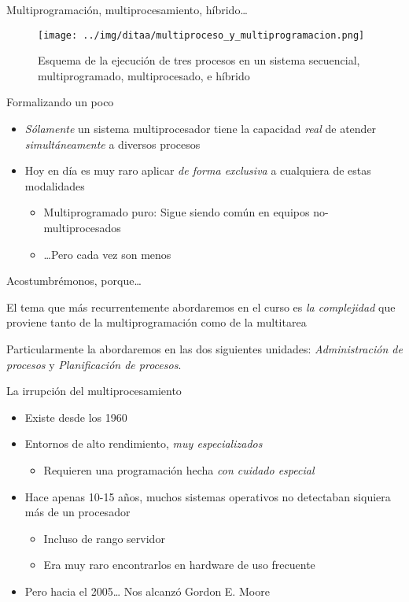 \documentclass[presentation]{beamer}
\begin{document}
\begin{frame}[label={sec:org132e663}]{Multiprogramación, multiprocesamiento, híbrido\ldots{}}
\begin{figure}[htbp]
\centering
\texttt{[image: ../img/ditaa/multiproceso\_y\_multiprogramacion.png]}
\caption{Esquema de la ejecución de tres procesos en un sistema secuencial, multiprogramado, multiprocesado, e híbrido}
\end{figure}
\end{frame}

\begin{frame}[label={sec:org3a3e112}]{Formalizando un poco}
\begin{itemize}
\item \emph{Sólamente} un sistema multiprocesador tiene la capacidad \emph{real} de
atender \emph{simultáneamente} a diversos procesos
\item Hoy en día es muy raro aplicar \emph{de forma exclusiva} a cualquiera de
estas modalidades
\begin{itemize}
\item Multiprogramado puro: Sigue siendo común en equipos
no-multiprocesados
\item \ldots{}Pero cada vez son menos
\end{itemize}
\end{itemize}
\end{frame}

\begin{frame}[label={sec:orge6e858b}]{Acostumbrémonos, porque\ldots{}}
\begin{center}
El tema que más recurrentemente abordaremos en el curso es \emph{la
complejidad} que proviene tanto de la multiprogramación como de la
multitarea

Particularmente la abordaremos en las dos siguientes unidades:
\emph{Administración de procesos} y \emph{Planificación de procesos}.
\end{center}
\end{frame}

\begin{frame}[label={sec:org0b46568}]{La irrupción del multiprocesamiento}
\begin{itemize}
\item Existe desde los 1960
\item Entornos de alto rendimiento, \emph{muy especializados}
\begin{itemize}
\item Requieren una programación hecha \emph{con cuidado especial}
\end{itemize}
\item Hace apenas 10-15 años, muchos sistemas operativos no detectaban
siquiera más de un procesador
\begin{itemize}
\item Incluso de rango servidor
\item Era muy raro encontrarlos en hardware de uso frecuente
\end{itemize}
\item Pero hacia el 2005\ldots{} Nos alcanzó Gordon E. Moore
\end{itemize}
\end{frame}
\end{document}
